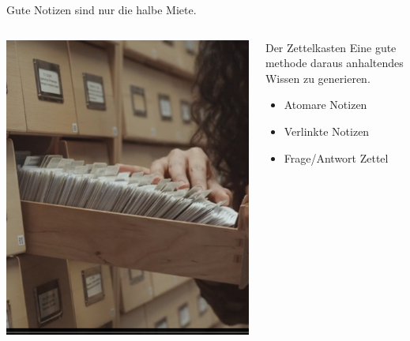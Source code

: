 \documentclass[aspectratio=169,shownotes]{beamer}
\begin{document}
\begin{frame}{Gute Notizen sind nur die halbe Miete. }
    \begin{columns}
        \begin{column}{0.4\textwidth}
            \includegraphics[width=\textwidth]{graphics/Zettelkasten.png}
        \end{column}
        \begin{column}[t]{0.6\textwidth}   
            \vspace{-3.5cm}
            \begin{block}{Der Zettelkasten}
                Eine gute methode daraus anhaltendes Wissen zu generieren.
                \begin{itemize}
                    \item Atomare Notizen
                    \item Verlinkte Notizen
                    \item Frage/Antwort Zettel
                \end{itemize} 
            \end{block}                     
        \end{column}        
    \end{columns}    
\end{frame}
\end{document}
